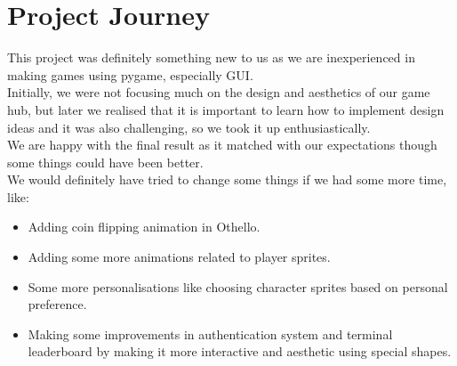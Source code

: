 \documentclass{article}
\begin{document}
\section{Project Journey}

This project was definitely something new to us as we are inexperienced in making games using pygame, especially GUI.
\\
Initially, we were not focusing much on the design and aesthetics of our game hub, but later we realised that it is important to learn how to implement design ideas and it was also challenging, so we took it up enthusiastically.
\\
We are happy with the final result as it matched with our expectations though some things could have been better.
\\
We would definitely have tried to change some things if we had some more time, like:
\begin{itemize}
    \item Adding coin flipping animation in Othello.
    \item Adding some more animations related to player sprites.
    \item Some more personalisations like choosing character sprites based on personal preference.
    \item Making some improvements in authentication system and terminal leaderboard by making it more interactive and aesthetic using special shapes.

\end{itemize}
\printbibliography
\end{document}
